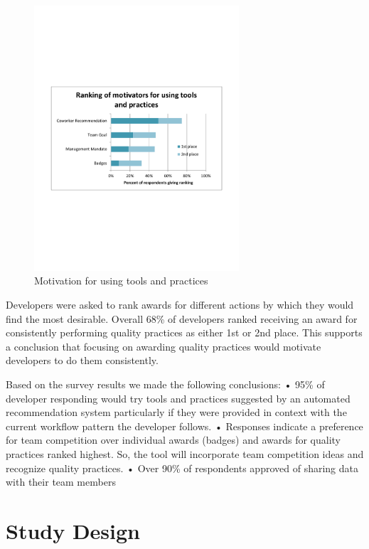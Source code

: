 \documentclass{sig-alternate}
\begin{document}
\begin{figure}\begin{mdframed}[linecolor=white]
	\includegraphics[width=3in]{ToolAndPracticeMotivators.pdf}
	\caption{Motivation for using tools and practices}
	\label{fig:toolandpracticemotivators}
\end{mdframed}\end{figure}

Developers were asked to rank awards for different actions by which they would find the most desirable.  Overall 68\% of developers ranked receiving an award for consistently performing quality practices as either 1st or 2nd place.  This supports a conclusion that focusing on awarding quality practices would motivate developers to do them consistently.
 
Based on the survey results we made the following conclusions:
•	95\% of developer responding would try tools and practices suggested by an automated recommendation system particularly if they were provided in context with the current workflow pattern the developer follows.
•	Responses indicate a preference for team competition over individual awards (badges) and awards for quality practices ranked highest.  So, the tool will incorporate team competition ideas and recognize quality practices.
•	Over 90\% of respondents approved of sharing data with their team members


\section{Study Design}
\end{document}
